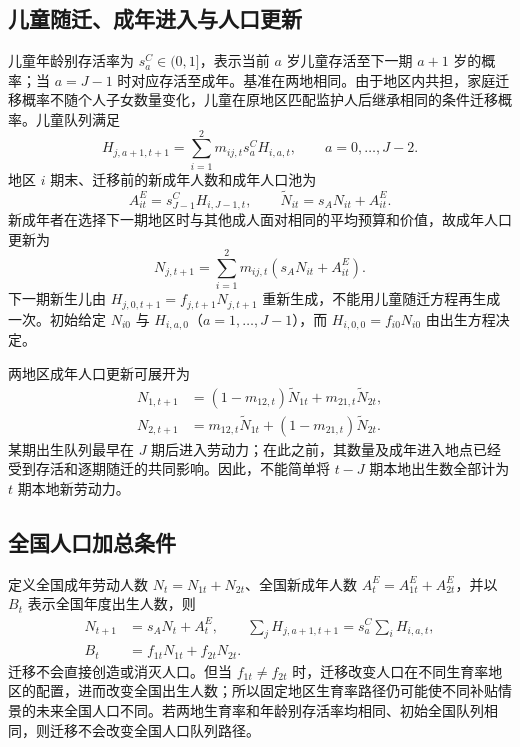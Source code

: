 \documentclass[UTF8,a4paper,zihao=-4,fontset=windows]{ctexart}
\numberwithin{equation}{section}
\begin{document}
\subsection{儿童随迁、成年进入与人口更新}
儿童年龄别存活率为 $s^C_a\in(0,1]$，表示当前 $a$ 岁儿童存活至下一期 $a+1$ 岁的概率；当 $a=J-1$ 时对应存活至成年。基准在两地相同。由于地区内共担，家庭迁移概率不随个人子女数量变化，儿童在原地区匹配监护人后继承相同的条件迁移概率。儿童队列满足
\begin{equation}
  H_{j,a+1,t+1}=\sum_{i=1}^2m_{ij,t}s^C_aH_{i,a,t},
  \qquad a=0,\ldots,J-2.
  \label{eq:child-transition}
\end{equation}
地区 $i$ 期末、迁移前的新成年人数和成年人口池为
\begin{equation}
  A^E_{it}=s^C_{J-1}H_{i,J-1,t},\qquad
  \widetilde N_{it}=s_AN_{it}+A^E_{it}.
  \label{eq:entrants}
\end{equation}
新成年者在选择下一期地区时与其他成人面对相同的平均预算和价值，故成年人口更新为
\begin{equation}
  N_{j,t+1}=\sum_{i=1}^2m_{ij,t}
                 (s_AN_{it}+A^E_{it}).
  \label{eq:adult-transition}
\end{equation}
下一期新生儿由 $H_{j,0,t+1}=f_{j,t+1}N_{j,t+1}$ 重新生成，不能用儿童随迁方程再生成一次。初始给定 $N_{i0}$ 与 $H_{i,a,0}$（$a=1,\ldots,J-1$），而 $H_{i,0,0}=f_{i0}N_{i0}$ 由出生方程决定。

两地区成年人口更新可展开为
\begin{align}
  N_{1,t+1}&=(1-m_{12,t})\widetilde N_{1t}
                  +m_{21,t}\widetilde N_{2t},\\
  N_{2,t+1}&=m_{12,t}\widetilde N_{1t}
                  +(1-m_{21,t})\widetilde N_{2t}.
  \label{eq:two-region-transition}
\end{align}
某期出生队列最早在 $J$ 期后进入劳动力；在此之前，其数量及成年进入地点已经受到存活和逐期随迁的共同影响。因此，不能简单将 $t-J$ 期本地出生数全部计为 $t$ 期本地新劳动力。

\subsection{全国人口加总条件}
定义全国成年劳动人数 $N_t=N_{1t}+N_{2t}$、全国新成年人数 $A^E_t=A^E_{1t}+A^E_{2t}$，并以 $B_t$ 表示全国年度出生人数，则
\begin{align}
  N_{t+1}&=s_AN_t+A^E_t,\qquad
  \sum_jH_{j,a+1,t+1}=s^C_a\sum_iH_{i,a,t},\\
  B_t&=f_{1t}N_{1t}+f_{2t}N_{2t}.
  \label{eq:national-demography}
\end{align}
迁移不会直接创造或消灭人口。但当 $f_{1t}\ne f_{2t}$ 时，迁移改变人口在不同生育率地区的配置，进而改变全国出生人数；所以固定地区生育率路径仍可能使不同补贴情景的未来全国人口不同。若两地生育率和年龄别存活率均相同、初始全国队列相同，则迁移不会改变全国人口队列路径。
\end{document}
